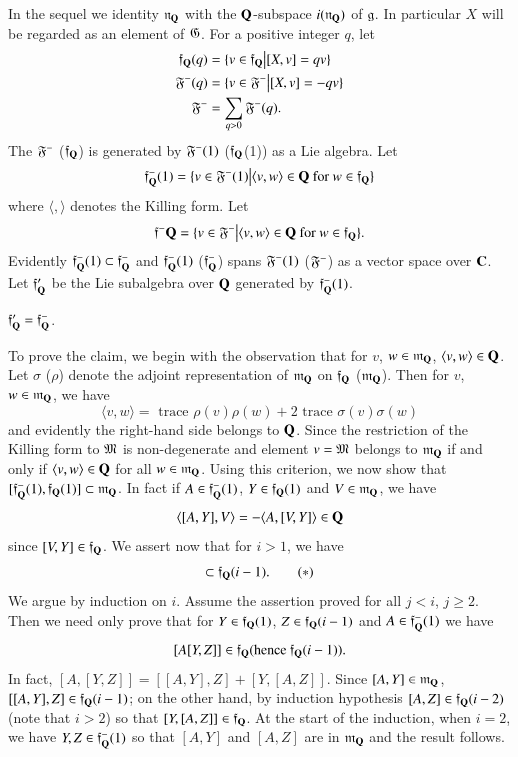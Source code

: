 In the sequel we identity $\mathfrak{n}_{\mathbf{Q}}$ with the $\mathbf{Q}$-subspace $i (\mathfrak{n}_{\mathbf{Q}})$ of $\mathfrak{g}$. In particular $X$ will be regarded as an element of $\mathfrak{G}$. For a positive integer $q$, let
\begin{align*}
\mathfrak{f}_{\mathbf{Q}} (q) & = \{v \in \mathfrak{f}_{\mathbf{Q}} \big| [X, v] = q v\}\\
\mathfrak{F}^- (q) & = \{v \in \mathfrak{F}^- \big| [X,v] = - qv\} \\
\mathfrak{F}^- & = \sum\limits_{q > 0} \mathfrak{F}^- (q).
\end{align*}\pageoriginale 
The $\mathfrak{F}^-$ (\resp $\mathfrak{f}_{\mathbf{Q}}$)  is generated by $\mathfrak{F}^-(1)$ (\resp $\mathfrak{f}_{\mathbf{Q}}$(1)) as a Lie algebra. Let 
$$
\mathfrak{f}^-_{\mathbf{Q}} (1) = \{v \in \mathfrak{F}^-(1) \big| \langle v, w \rangle \in \mathbf{Q} \text{ for } w \in \mathfrak{f}_{\mathbf{Q}}\}
$$
where $\langle ,\rangle$ denotes the Killing form. Let 
$$
\mathfrak{f}^-\mathbf{Q} = \{v \in \mathfrak{F}^- \big| \langle v, w \rangle \in \mathbf{Q} \text{ for } w \in \mathfrak{f}_{\mathbf{Q}}\}.
$$
Evidently $\mathfrak{f}^-_{\mathbf{Q}} (1) \subset\mathfrak{f}^-_{\mathbf{Q}}$  and $\mathfrak{f}^-_{\mathbf{Q}} (1)$ (\resp $\mathfrak{f}^-_{\mathbf{Q}}$) spans $\mathfrak{F}^-(1)$ (\resp $\mathfrak{F}^-$) as a vector space over $\mathbf{C}$. Let $\mathfrak{f}'_{\mathbf{Q}}$ be the Lie subalgebra over $\mathbf{Q}$ generated by $\mathfrak{f}^-_{\mathbf{Q}} (1)$.

\begin{claim}\label{art9-claim3.34}
$\mathfrak{f}'_{\mathbf{Q}} = \mathfrak{f}^-_{\mathbf{Q}}$.
\end{claim}

To prove the claim, we begin with the observation that for $v$, $w \in \mathfrak{m}_{\mathbf{Q}}$, $\langle v, w \rangle \in \mathbf{Q}$. Let $\sigma$ (\resp $\rho$) denote the adjoint representation of $\mathfrak{m}_{\mathbf{Q}}$ on $\mathfrak{f}_{\mathbf{Q}}$ (\resp $\mathfrak{m}_{\mathbf{Q}}$). Then for $v$, $w \in \mathfrak{m}_{\mathbf{Q}}$, we have 
$$
\langle v, w \rangle= \text{ trace } \rho (v) \rho (w) + 2 \text{ trace } \sigma (v) \sigma (w)
$$
and evidently the right-hand side belongs to $\mathbf{Q}$. Since the restriction of the Killing form to $\mathfrak{M}$ is non-degenerate and element $v = \mathfrak{M}$ belongs to $\mathfrak{m}_{\mathbf{Q}}$ if and only if $\langle v, w \rangle \in \mathbf{Q}$ for all $w \in \mathfrak{m}_{\mathbf{Q}}$. Using this criterion, we now show that $[\mathfrak{f}^-_{\mathbf{Q}} (1), \mathfrak{f}_{\mathbf{Q}} (1)] \subset \mathfrak{m}_{\mathbf{Q}}$. In fact if $A \in \mathfrak{f}^-_{\mathbf{Q}}(1)$, $Y \in \mathfrak{f}_{\mathbf{Q}} (1)$ and $V \in \mathfrak{m}_{\mathbf{Q}}$, we have
$$
\langle [A, Y], V\rangle  = - \langle A, [V, Y] \rangle \in \mathbf{Q}
$$
since $[V, Y] \in \mathfrak{f}_{\mathbf{Q}}$. We assert now that for $i > 1$, we have
\begin{equation*}
[\ff^-_\bQ (1), \; \ff_\bQ(i] \subset \ff_\bQ (i-1). \tag*{($\ast$)}
\end{equation*}
We argue by induction on $i$. Assume the assertion proved for all $j < i$, $j \geqslant 2$. Then we need only prove that for $Y \in \mathfrak{f}_{\mathbf{Q}} (1)$, $Z \in \mathfrak{f}_{\mathbf{Q}} (i-1)$ and $A \in \mathfrak{f}^-_{\mathbf{Q}} (1)$ we have 
$$
[A [Y, Z]] \in \mathfrak{f}_{\mathbf{Q}} (\text{hence } \mathfrak{f}_{\mathbf{Q}} (i-1)).
$$
In fact, $[A, [Y, Z]] = [[A, Y], Z] + [Y , [A, Z]]$. Since $[A, Y ] \in \mathfrak{m}_{\mathbf{Q}}$, $[[A, Y], Z] \in \mathfrak{f}_{\mathbf{Q}} (i-1)$; on the other hand, by induction hypothesis $[A, Z] \in \mathfrak{f}_{\mathbf{Q}} (i-2)$\pageoriginale (note that $i > 2$) so that $[Y, [A, Z]] \in \mathfrak{f}_{\mathbf{Q}}$. At the start of the induction, when $i=2$, we have $Y, Z \in \mathfrak{f}^-_{\mathbf{Q}} (1)$ so that $[A,Y]$ and $[A, Z]$ are in $\mathfrak{m}_{\mathbf{Q}}$ and the result follows.

